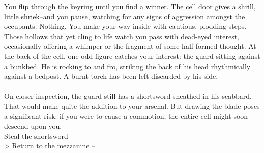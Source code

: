 You flip through the keyring until you find a winner. The cell door gives a shrill, little shriek--and you pause, watching for any signs of aggression amongst the occupants. Nothing. You make your way inside with cautious, plodding steps.\\

Those hollows that yet cling to life watch you pass with dead-eyed interest, occasionally offering a whimper or the fragment of some half-formed thought. At the back of the cell, one odd figure catches your interest: the guard sitting against a bunkbed. He is rocking to and fro, striking the back of his head rhythmically against a bedpost. A burnt torch has been left discarded by his side.\\
\\

On closer inspection, the guard still has a shortsword sheathed in his scabbard. That would make quite the addition to your arsenal. But drawing the blade poses a significant risk: if you were to cause a commotion, the entire cell might soon descend upon you.\\

 Steal the shortsword -- \\
> Return to the mezzanine -- 